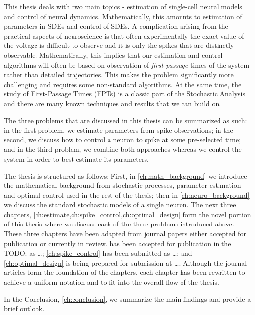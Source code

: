 \documentclass{report}
\begin{document}
This thesis deals with two main topics - estimation of single-cell neural models
and control of neural dynamics. Mathematically, this amounts to estimation of
parameters in SDEs and control of SDEs. A complication arising from the
practical aspects of neuroscience is that often experimentally the exact value
of the voltage is difficult to observe and it is only the spikes that are
distinctly observable. Mathematically, this implies that our estimation
and control algorithms will often be based on observation of {\sl first
passage} times of the system rather than detailed trajectories. This makes the problem
significantly more challenging and requires some non-standard
algorithms. At the same time, the study of First-Passage Times (FPTs) is a
classic part of the Stochastic Analysis and there are many known
techniques and results that we can build on.

The three problems that are discussed in this thesis can be summarized as
such: in the first problem, we estimate parameters from spike observations; 
in the second, we discuss how to control a neuron to spike at some pre-selected
time; and in the third problem, we combine both approaches whereas we
control the system in order to best estimate its parameters.

The thesis is structured as follows: First, in \cref{ch:math_background} we
introduce the mathematical background from stochastic processes, parameter
estimation and optimal control used in the rest of the thesis; then in
\cref{ch:neuro_background} we discuss the standard stochastic models of a single
neuron. The next three chapters,
\cref{ch:estimate,ch:spike_control,ch:optimal_design} form the novel portion of this thesis where we discuss each of the three
problems introduced above. These three chapters have been adapted from journal
papers either accepted for publication or currently in review.
 has been accepted for publication in the TODO: as \ldots;
\cref{ch:spike_control} has been submitted as \ldots; and \cref{ch:optimal_design} is being prepared for submission at \ldots. Although the journal articles form the foundation of the
chapters, each chapter has been rewritten to achieve a uniform notation and to
fit into the overall flow of the thesis.

In the Conclusion, \cref{ch:conclusion}, we summarize the main findings and
provide a brief outlook.


\cleardoublepage

\cleardoublepage
%  

\cleardoublepage

\cleardoublepage

\cleardoublepage
\end{document}
